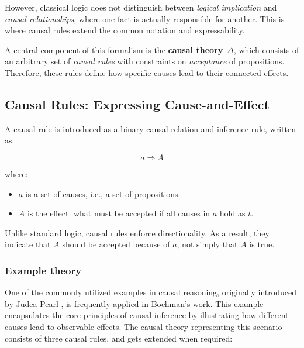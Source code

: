 \documentclass[seminar,palatino,english]{AIGpaper}
\newcommand{\ignore}[1]{}
\begin{document}
However, classical logic does not distinguish between \emph{logical implication} and \emph{causal relationships}, where one fact is actually responsible for another. This is where causal rules extend the common notation and expressability.

 A central component of this formalism is the \textbf{causal theory}~$\Delta$, which consists of an arbitrary set of \emph{causal rules} with constraints on \emph{acceptance} of propositions. Therefore, these rules define how specific causes lead to their connected effects. 


\subsection{Causal Rules: Expressing Cause-and-Effect}

\ignore{
    \begin{itemize}
        \item Causal relation: $a \Rightarrow B$.
        \item Theory $\Delta$: set of rules.
    \end{itemize}
}

A causal rule is introduced as a binary causal relation and inference rule, written as:

\begin{equation}
    a \Rightarrow A
\end{equation}

where:

\begin{itemize}
    \item $ a $ is a set of causes, i.e., a set of propositions.
    \item $ A $ is the effect: what must be accepted if all causes in $ a $ hold as $ t $.
\end{itemize}

Unlike standard logic, causal rules enforce directionality. As a result, they indicate that $ A $ should be accepted because of $ a $, not simply that $ A $ is true.


\subsubsection{Example theory}

One of the commonly utilized examples in causal reasoning, originally introduced by Judea Pearl \cite{pearl_embracing_1988}, is frequently applied in Bochman’s work. This example encapsulates the core principles of causal inference by illustrating how different causes lead to observable effects. The causal theory representing this scenario consists of three causal rules, and gets extended when required:
\end{document}
